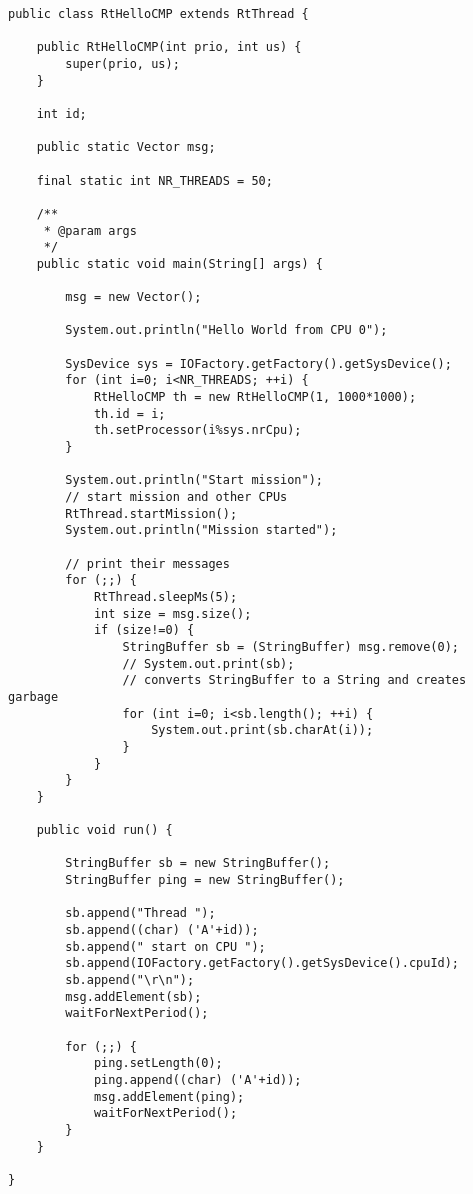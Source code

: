 \begin{verbatim}
public class RtHelloCMP extends RtThread {

    public RtHelloCMP(int prio, int us) {
        super(prio, us);
    }

    int id;

    public static Vector msg;

    final static int NR_THREADS = 50;

    /**
     * @param args
     */
    public static void main(String[] args) {

        msg = new Vector();

        System.out.println("Hello World from CPU 0");

        SysDevice sys = IOFactory.getFactory().getSysDevice();
        for (int i=0; i<NR_THREADS; ++i) {
            RtHelloCMP th = new RtHelloCMP(1, 1000*1000);
            th.id = i;
            th.setProcessor(i%sys.nrCpu);
        }

        System.out.println("Start mission");
        // start mission and other CPUs
        RtThread.startMission();
        System.out.println("Mission started");

        // print their messages
        for (;;) {
            RtThread.sleepMs(5);
            int size = msg.size();
            if (size!=0) {
                StringBuffer sb = (StringBuffer) msg.remove(0);
                // System.out.print(sb);
                // converts StringBuffer to a String and creates garbage
                for (int i=0; i<sb.length(); ++i) {
                    System.out.print(sb.charAt(i));
                }
            }
        }
    }

    public void run() {

        StringBuffer sb = new StringBuffer();
        StringBuffer ping = new StringBuffer();

        sb.append("Thread ");
        sb.append((char) ('A'+id));
        sb.append(" start on CPU ");
        sb.append(IOFactory.getFactory().getSysDevice().cpuId);
        sb.append("\r\n");
        msg.addElement(sb);
        waitForNextPeriod();

        for (;;) {
            ping.setLength(0);
            ping.append((char) ('A'+id));
            msg.addElement(ping);
            waitForNextPeriod();
        }
    }

}
\end{verbatim}
